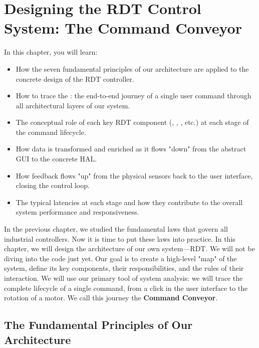 
\chapter{Designing the RDT Control System: The Command Conveyor}
\label{chap:rdt_design}

\begin{navigationbox}{In this chapter, you will learn:}
    \begin{itemize}
        \item How the seven fundamental principles of our architecture are applied to the concrete design of the RDT controller.
        \item How to trace the : the end-to-end journey of a single user command through all architectural layers of our system.
        \item The conceptual role of each key RDT component (, , , etc.) at each stage of the command lifecycle.
        \item How data is transformed and enriched as it flows "down" from the abstract GUI to the concrete HAL.
        \item How feedback flows "up" from the physical sensors back to the user interface, closing the control loop.
        \item The typical latencies at each stage and how they contribute to the overall system performance and responsiveness.
    \end{itemize}
\end{navigationbox}

In the previous chapter, we studied the fundamental laws that govern all industrial controllers. Now it is time to put these laws into practice. In this chapter, we will design the architecture of our own system—RDT. We will not be diving into the code just yet. Our goal is to create a high-level "map" of the system, define its key components, their responsibilities, and the rules of their interaction. We will use our primary tool of system analysis: we will trace the complete lifecycle of a single command, from a click in the user interface to the rotation of a motor. We call this journey the \textbf{Command Conveyor}.

\section{The Fundamental Principles of Our Architecture}
\label{sec:rdt_principles}

